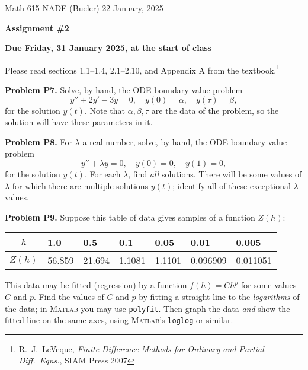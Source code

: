 \documentclass[12pt]{amsart}
\newcommand{\Matlab}{\textsc{Matlab}\xspace}
\newcommand{\prob}[1]{\bigskip\noindent\textbf{#1}\quad }
\begin{document}
\scriptsize \noindent Math 615 NADE (Bueler) \hfill 22 January, 2025
\normalsize

\medskip\bigskip

\Large\centerline{\textbf{Assignment \#2}}
\large
\bigskip

\centerline{\textbf{Due Friday, 31 January 2025, at the start of class}}
\bigskip
\normalsize

\thispagestyle{empty}

\bigskip
Please read sections 1.1--1.4, 2.1--2.10, and Appendix A from the textbook.\footnote{R.~J.~LeVeque, \emph{Finite Difference Methods for Ordinary and Partial Diff.~Eqns.}, SIAM Press 2007}


\prob{Problem P7.}  Solve, by hand, the ODE boundary value problem
\begin{equation*}
y'' + 2 y' - 3 y = 0, \quad y(0)=\alpha, \quad y(\tau)=\beta,
\end{equation*}
for the solution $y(t)$.  Note that $\alpha,\beta,\tau$ are the data of the problem, so the solution will have these parameters in it.


\prob{Problem P8.}  For $\lambda$ a real number, solve, by hand, the ODE boundary value problem
\begin{equation*}
y'' + \lambda y = 0, \quad y(0)=0, \quad y(1)=0,
\end{equation*}
for the solution $y(t)$.  For each $\lambda$, find \emph{all} solutions.  There will be some values of $\lambda$ for which there are multiple solutions $y(t)$; identify all of these exceptional $\lambda$ values.


\prob{Problem P9.}  Suppose this table of data gives samples of a function $Z(h)$:

\smallskip
\begin{center}
\begin{tabular}{c|l|l|l|l|l|l}
$h$ & 1.0     & 0.5    & 0.1    & 0.05   & 0.01     & 0.005 \\ \hline
$Z(h)$ & 56.859  & 21.694 & 1.1081 & 1.1101 & 0.096909 & 0.011051
\end{tabular}
\end{center}

\medskip
\noindent This data may be fitted (regression) by a function $f(h) = C h^p$ for some values $C$ and $p$.  Find the values of $C$ and $p$ by fitting a straight line to the \emph{logarithms} of the data; in \Matlab you may use \texttt{polyfit}.  Then graph the data \emph{and} show the fitted line on the same axes, using \Matlab's \texttt{loglog} or similar.
\end{document}
